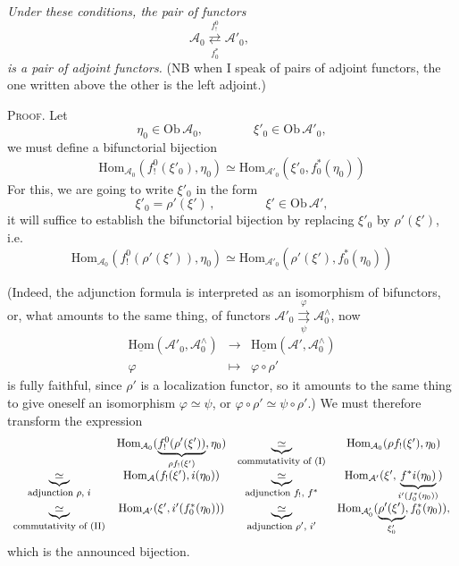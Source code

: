 \documentclass[11pt]{article}
\newcommand{\printedpage}[1]{\marginpar{\footnotesize p.~#1}}
\newcommand{\msp}[1]{\marginpar{\footnotesize [#1]}}
\newcommand{\Ob}{\mathrm{Ob}\,}
\newcommand{\Hom}{\mathrm{Hom}}
\newcommand{\uHom}{\underline{\mathrm{Hom}}}
\newcommand{\cA}{\mathcal{A}}
\newcommand{\adj}[2]{\mathrel{\underset{#2}{\overset{#1}{\rightleftarrows}}}}
\begin{document}
\textit{Under these conditions, the pair of functors}
\[
\cA_0 \adj{f_!^0}{f_0^*} \cA'_0, \qquad
\]
\textit{is a pair of adjoint functors.} (NB when I speak of pairs of adjoint functors, the one written above the other is the left adjoint.)

\textsc{Proof}. Let
\[
\eta_0 \in \Ob \cA_0, \qquad\qquad \xi'_0 \in \Ob \cA'_0,
\]
we must define a bifunctorial bijection
\[
\Hom_{\cA_0}(f_!^0(\xi'_0), \eta_0) \simeq \Hom_{\cA'_0}(\xi'_0, f_0^*(\eta_0))
\]
For this, we are going to write $\xi'_0$ in the form
\[
\xi'_0 = \rho'(\xi')\,, \qquad\qquad \xi' \in \Ob \cA',
\]
it will suffice to establish the bifunctorial bijection by replacing $\xi'_0$ by $\rho'(\xi')$, i.e.
\[
\Hom_{\cA_0}(f_!^0(\rho'(\xi')), \eta_0) \simeq \Hom_{\cA'_0}(\rho'(\xi'), f_0^*(\eta_0))
\]


\printedpage{92}

\msp{page 150}
(Indeed, the adjunction formula is interpreted as an isomorphism of bifunctors, or, what amounts to the same thing, of functors $\cA'_0 \mathrel{\underset{\psi}{\overset{\varphi}{\rightrightarrows}}} \cA_0^{\wedge}$, now
\[
\begin{array}{ccc}
\uHom(\cA'_0, \cA_0^{\wedge}) & \longrightarrow & \uHom(\cA', \cA_0^{\wedge}) \\[1ex]
\varphi & \longmapsto & \varphi \circ \rho'
\end{array}
\]
is fully faithful, since $\rho'$ is a localization functor, so it amounts to the same thing to give oneself an isomorphism $\varphi \simeq \psi$, or $\varphi \circ \rho' \simeq \psi \circ \rho'$.) We must therefore transform the expression
\[
\begin{array}{cccc}
 & \Hom_{\cA_0}(\underbrace{f_!^0(\rho'(\xi'))}_{\rho f_!(\xi')}, \eta_0) & \underbrace{\simeq}_{\text{\footnotesize commutativity of (I)}} & \Hom_{\cA_0}(\rho f_!(\xi'), \eta_0) \\[3ex]
\underbrace{\simeq}_{\text{\footnotesize adjunction $\rho$, $i$}} & \Hom_{\cA}(f_!(\xi'), i(\eta_0)) & \underbrace{\simeq}_{\text{\footnotesize adjunction $f_!$, $f^*$}} & \Hom_{\cA'}(\xi', \underbrace{f^*i(\eta_0)}_{i'(f_0^*(\eta_0))}) \\[3ex]
\underbrace{\simeq}_{\text{\footnotesize commutativity of (II)}} & \Hom_{\cA'}(\xi', i'(f_0^*(\eta_0))) & \underbrace{\simeq}_{\text{\footnotesize adjunction $\rho'$, $i'$}} & \Hom_{\cA'_0}(\underbrace{\rho'(\xi')}_{\xi'_0}, f_0^*(\eta_0)),
\end{array}
\]
which is the announced bijection.
\end{document}
